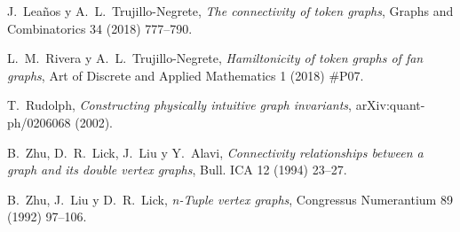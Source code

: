 \begin{thebibliography}{99}
  J.~Lea\~{n}os y A.~L.~Trujillo-Negrete,
  \textit{The connectivity of token graphs},
  Graphs and Combinatorics 34 (2018) 777--790. 
 
  L.~M.~Rivera y A.~L.~Trujillo-Negrete,
  \textit{Hamiltonicity of token graphs of fan graphs},
  Art of Discrete and Applied Mathematics 1 (2018) \#P07. 

  T.~Rudolph,
  \textit{Constructing physically intuitive graph invariants},
  arXiv:quant-ph/0206068 (2002).

  B.~Zhu, D.~R.~Lick, J.~Liu y Y.~Alavi,
  \textit{Connectivity relationships between a graph and its double vertex
  graphs},
  Bull. ICA 12 (1994) 23--27.

  B.~Zhu, J.~Liu y D.~R.~Lick,
  \textit{n-Tuple vertex graphs},
  Congressus Numerantium 89 (1992) 97--106.


\end{thebibliography}
